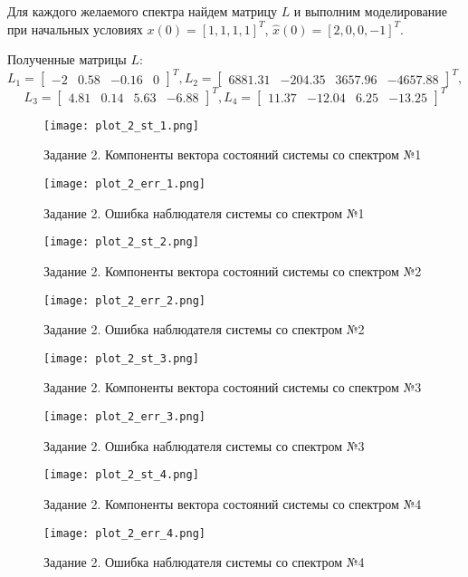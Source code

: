 Для каждого желаемого спектра найдем матрицу $L$ и выполним моделирование при начальных
условиях $x(0)=[1, 1, 1, 1]^T$, $\hat x(0)=[2, 0, 0, -1]^T$.

Полученные матрицы $L$:
\begin{equation*}
    L_1 = \begin{bmatrix}
        -2 & 0.58 & -0.16 & 0
    \end{bmatrix}^T,
    L_2 = \begin{bmatrix}
        6881.31 & -204.35 & 3657.96 & -4657.88
    \end{bmatrix}^T,
\end{equation*}
\begin{equation*}
    L_3 = \begin{bmatrix}
        4.81 & 0.14 & 5.63 & -6.88
    \end{bmatrix}^T,
    L_4 = \begin{bmatrix}
        11.37 & -12.04 & 6.25 & -13.25
    \end{bmatrix}^T
\end{equation*}
\begin{figure}[]
    \centering
    \texttt{[image: plot\_2\_st\_1.png]}
    \caption{\label{fig:The-caption-1}Задание 2. Компоненты вектора состояний системы со спектром №1}
\end{figure}
\begin{figure}[]
    \centering
    \texttt{[image: plot\_2\_err\_1.png]}
    \caption{\label{fig:The-caption-1}Задание 2. Ошибка наблюдателя системы со спектром №1}
\end{figure}
\begin{figure}[]
    \centering
    \texttt{[image: plot\_2\_st\_2.png]}
    \caption{\label{fig:The-caption-1}Задание 2. Компоненты вектора состояний системы со спектром №2}
\end{figure}
\begin{figure}[]
    \centering
    \texttt{[image: plot\_2\_err\_2.png]}
    \caption{\label{fig:The-caption-1}Задание 2. Ошибка наблюдателя системы со спектром №2}
\end{figure}
\begin{figure}[]
    \centering
    \texttt{[image: plot\_2\_st\_3.png]}
    \caption{\label{fig:The-caption-1}Задание 2. Компоненты вектора состояний системы со спектром №3}
\end{figure}
\begin{figure}[]
    \centering
    \texttt{[image: plot\_2\_err\_3.png]}
    \caption{\label{fig:The-caption-1}Задание 2. Ошибка наблюдателя системы со спектром №3}
\end{figure}
\begin{figure}[]
    \centering
    \texttt{[image: plot\_2\_st\_4.png]}
    \caption{\label{fig:The-caption-1}Задание 2. Компоненты вектора состояний системы со спектром №4}
\end{figure}
\begin{figure}[]
    \centering
    \texttt{[image: plot\_2\_err\_4.png]}
    \caption{\label{fig:The-caption-1}Задание 2. Ошибка наблюдателя системы со спектром №4}
\end{figure}

